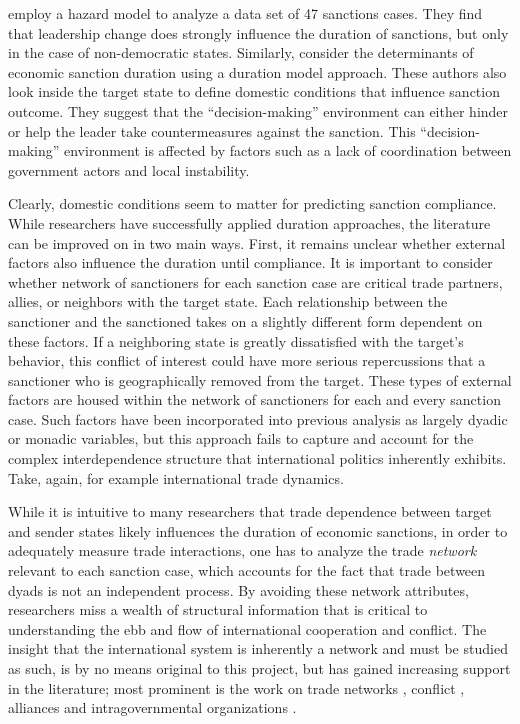 \cite{mcgillivray2004} employ a hazard model to analyze a data set of 47 sanctions cases. They find that leadership change does strongly influence the duration of sanctions, but only in the case of non-democratic states. Similarly, \cite{bolks2000} consider the determinants of economic sanction duration using a duration model approach. These authors also look inside the target state to define domestic conditions that influence sanction outcome. They suggest that the ``decision-making'' environment can either hinder or help the leader take countermeasures against the sanction. This ``decision-making'' environment is affected by factors such as a lack of coordination between government actors and local instability. 

Clearly, domestic conditions seem to matter for predicting sanction compliance. While researchers have successfully applied duration approaches, the literature can be improved on in two main ways. First, it remains unclear whether external factors also influence the duration until compliance. It is important to consider whether network of sanctioners for each sanction case are critical trade partners, allies, or neighbors with the target state. Each relationship between the sanctioner and the sanctioned takes on a slightly different form dependent on these factors. If a neighboring state is greatly dissatisfied with the target's behavior, this conflict of interest could have more serious repercussions that a sanctioner who is geographically removed from the target. These types of external factors are housed within the network of sanctioners for each and every sanction case. Such factors have been incorporated into previous analysis as largely dyadic or monadic variables, but this approach fails to capture and account for the complex interdependence structure that international politics inherently exhibits. Take, again, for example international trade dynamics. 

While it is intuitive to many researchers that trade dependence between target and sender states likely influences the duration of economic sanctions, in order to adequately measure trade interactions, one has to analyze the trade \textit{network} relevant to each sanction case, which accounts for the fact that trade between dyads is not an independent process. By avoiding these network attributes, researchers miss a wealth of structural information that is critical to understanding the ebb and flow of international cooperation and conflict. The insight that the international system is inherently a network and must be studied as such, is by no means original to this project, but has gained increasing support in the literature; most prominent is the work on trade networks \citep{hoff2004modeling} , conflict \citep{dorff2013}, alliances \citep{warren2010geometry} and intragovernmental organizations \citep{cao2009networks,greenhill2010norm}. 

